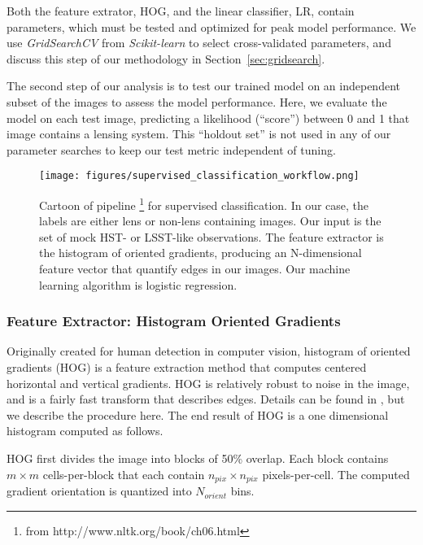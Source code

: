 \documentclass{emulateapj}
\begin{document}
Both the feature extrator, HOG, and the linear classifier, LR, contain
parameters, which must be tested and optimized for peak model
performance.  We use {\em GridSearchCV} from {\em Scikit-learn} to
select cross-validated parameters, and discuss this step of our
methodology in Section~\ref{sec:gridsearch}.

The second step of our analysis is to test our trained model on an
independent subset of the images to assess the model performance.
Here, we evaluate the model on each test image, predicting a
likelihood (``score'') between 0 and 1 that image contains a lensing
system.  This ``holdout set'' is not used in any of our parameter
searches to keep our test metric independent of tuning.

\begin{figure}[t]\label{fig:pipeline}
\begin{center}
\texttt{[image: figures/supervised\_classification\_workflow.png]}
\caption{Cartoon of pipeline \footnote{from
    http://www.nltk.org/book/ch06.html} for supervised classification.
  In our case, the labels are either lens or non-lens containing
  images.  Our input is the set of mock HST- or LSST-like
  observations.  The feature extractor is the histogram of oriented
  gradients, producing an N-dimensional feature vector that quantify
  edges in our images.  Our machine learning algorithm is logistic
  regression.}
\end{center}
\end{figure}

\subsubsection{Feature Extractor: Histogram Oriented Gradients}\label{sec:hog}
Originally created for human detection in computer vision, histogram of
oriented gradients (HOG) is a feature extraction method that computes
centered horizontal and vertical gradients. HOG is relatively robust
to noise in the image, and is a fairly fast transform that describes
edges.  Details can be found in \citet{dalalandtriggs_05}, but we
describe the procedure here.  The end result of HOG is a one
dimensional histogram computed as follows.

HOG first divides the image into blocks of 50\% overlap.  Each block
contains $m\times m$ cells-per-block that each contain $n_{pix}\times
n_{pix}$ pixels-per-cell.  The computed gradient orientation is
quantized into $N_{orient}$ bins.
\end{document}

